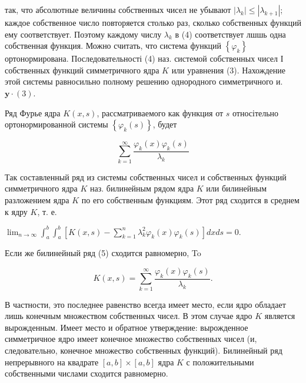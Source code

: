 \documentclass[10pt]{article}
\begin{document}
так, что абсолютные величины собственных чисел не убывают $\left|\lambda_{k}\right| \leqslant\left|\lambda_{k+1}\right|$; каждое собственное число повторяется столько раз, сколько собственных функций ему соответствует. Поэтому каждому числу $\lambda_{k}$ в (4) соответствует лшшь одна собственная функция. Можно считать, что система функций $\left\{\varphi_{k}\right\}$ ортонормирована. Последовательності (4) наз. системой собственных чисел І собственных функций симметричного ядра $K$ или уравнения (3). Нахождение этой системы равносильно полному решению однородного симметричного и. $\mathbf{y} \cdot(3)$.



Ряд Фурье ядра $K(x, s)$, рассматриваемого как функция от $s$ относітельно ортонормированной системы $\left\{\varphi_{k}(s)\right\}$, будет



\[

\sum_{k=1}^{\infty} \frac{\varphi_{k}(x) \varphi_{k}(s)}{\lambda_{k}}

\]



Так составленный ряд из системы собственных чисел и собственных функций симметричного ядра $K$ наз. билинейным рядом ядра $K$ или билинейным разложением ядра $K$ по его собственным функциям. Этот ряд сходится в среднем к ядру $K$, т. е.



$\lim _{n \rightarrow \infty} \int_{a}^{b} \int_{a}^{b}\left[K(x, s)-\sum_{k=1}^{n} \lambda_{k}^{2} \varphi_{k}(x) \varphi_{k}(s)\right] d x d s=0$.



Если же билинейный ряд (5) сходится равномерно, To



\[

K(x, s)=\sum_{k=1}^{\infty} \frac{\varphi_{k}(x) \varphi_{k}(s)}{\lambda_{k}} .

\]



В частности, это последнее равенство всегда имеет место, если ядро обладает лишь конечным множеством собственных чисел. В этом случае ядро $K$ является вырожденным. Имеет место и обратное утверждение: вырожденное симметричное ядро имеет конечное множество собственных чисел (и, следовательно, конечное множество собственных функций). Билинейный ряд непрерывного на квадрате $[a, b] \times[a, b]$ ядра $K$ с положительными собственными числами сходится равномерно.
\end{document}
